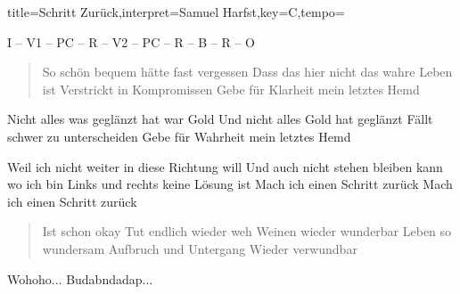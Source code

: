 \documentclass{leadsheet}
\begin{document}
\begin{song}{title={Schritt Zurück},interpret={Samuel Harfst},key={C},tempo={}}

\begin{schedule}
I -- V1 -- PC -- R -- V2 -- PC -- R -- B -- R -- O
\end{schedule}

\begin{verse}
So schön bequem hätte fast vergessen
Dass das hier nicht das wahre Leben ist
Verstrickt in Kompromissen
Gebe für Klarheit mein letztes Hemd
\end{verse}

\begin{prechorus}
Nicht alles was geglänzt hat war Gold
Und nicht alles Gold hat geglänzt
Fällt schwer zu unterscheiden
Gebe für Wahrheit mein letztes Hemd
\end{prechorus}

\begin{chorus}
Weil ich nicht weiter in diese Richtung will
Und auch nicht stehen bleiben kann wo ich bin
Links und rechts keine Lösung ist
Mach ich einen Schritt zurück
Mach ich einen Schritt zurück
\end{chorus}

\begin{verse}
Ist schon okay
Tut endlich wieder weh
Weinen wieder wunderbar
Leben so wundersam
Aufbruch und Untergang
Wieder verwundbar
\end{verse}

\begin{bridge}
Wohoho...
Budabndadap...
\end{bridge}

\end{song}
\end{document}
